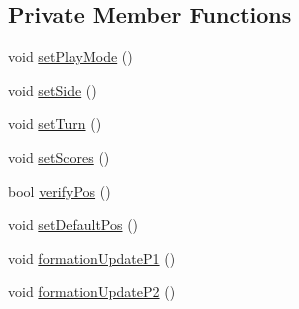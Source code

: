 \subsection*{Private Member Functions}
\begin{DoxyCompactItemize}
\item 
void \hyperlink{classInterpreter_aef305fb79ee56df26f7fa4d2fb1be84e}{setPlayMode} ()
\item 
void \hyperlink{classInterpreter_a7bcbe98cfcb820392776af34325af2f4}{setSide} ()
\item 
void \hyperlink{classInterpreter_a976750d75dbde52f1de42b189bc3db0d}{setTurn} ()
\item 
void \hyperlink{classInterpreter_ad947f5a13997ba025515d65be4ca13a3}{setScores} ()
\item 
bool \hyperlink{classInterpreter_af8a7d8d22248eefd43de2ea08fc61b0f}{verifyPos} ()
\item 
void \hyperlink{classInterpreter_aa64d5e94c2cdee7696135a360f51926b}{setDefaultPos} ()
\item 
void \hyperlink{classInterpreter_a0191e3c65605b0ebadb696cf540951ee}{formationUpdateP1} ()
\item 
void \hyperlink{classInterpreter_aa722fe96daeb04f61352559e6d29dda6}{formationUpdateP2} ()
\end{DoxyCompactItemize}
